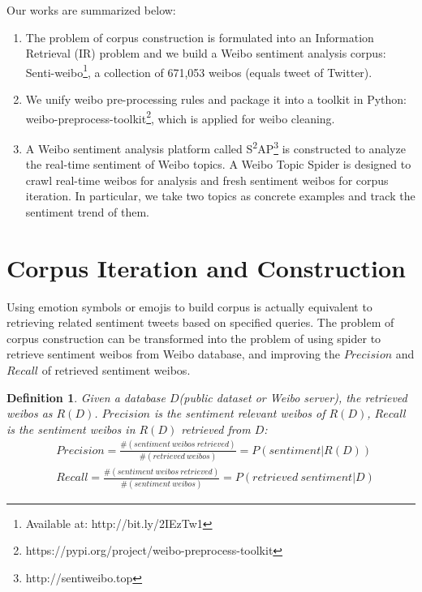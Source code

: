 \documentclass[runningheads]{llncs}
\begin{document}
Our works are summarized below:
\begin{enumerate}
\item The problem of corpus construction is formulated into an Information Retrieval (IR) problem and we build a Weibo sentiment analysis corpus: Senti-weibo\footnote{Available at: http://bit.ly/2IEzTw1}, a collection of 671,053 weibos (equals tweet of Twitter).

\item We unify weibo pre-processing rules and package it into a toolkit in Python: weibo-preprocess-toolkit\footnote{https://pypi.org/project/weibo-preprocess-toolkit}, which is applied for weibo cleaning. 

\item A Weibo sentiment analysis platform called S\textsuperscript{2}AP\footnote{http://sentiweibo.top} is constructed to analyze the real-time sentiment of Weibo topics. A Weibo Topic Spider is designed to crawl real-time weibos for analysis and fresh sentiment weibos for corpus iteration. In particular, we take two topics as concrete examples and track the sentiment trend of them.
\end{enumerate}


\section{Corpus Iteration and Construction}
Using emotion symbols or emojis to build corpus is actually equivalent to retrieving related sentiment tweets based on specified queries. The problem of corpus construction can be transformed into the problem of using spider to retrieve sentiment weibos from Weibo database, and improving the $Precision$ and $Recall$ of retrieved sentiment weibos. 

\newtheorem{myDef}{Definition}

\begin{myDef}
Given a database $D$(public dataset or Weibo server), the retrieved weibos as $R(D)$.  $Precision$ is the sentiment relevant weibos of $R(D)$, $Recall$ is the sentiment weibos in $R(D)$ retrieved from $D$:
\scriptsize{ %
\begin{align}
&Precision = \frac{\#\left ( sentiment\ weibos\ retrieved \right )}{\#\left ( retrieved\ weibos \right )} = P\left ( sentiment | R(D) \right ) \\
&Recall = \frac{\#\left ( sentiment\ weibos\ retrieved \right )}{\#\left ( sentiment\ weibos \right )} = P\left (retrieved\ sentiment | D\right )
\end{align}
} %
\end{myDef}
\end{document}
